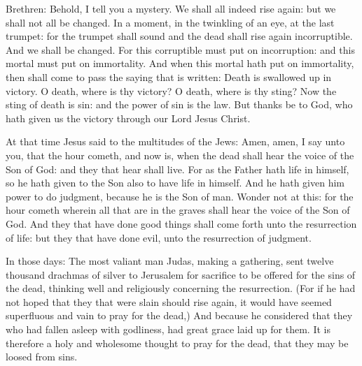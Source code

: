 




Brethren: Behold, I tell you a mystery. We shall all indeed rise again: but
we shall not all be changed.
In a moment, in the twinkling of an eye, at the last trumpet: for
the trumpet shall sound and the dead shall rise again incorruptible. And
we shall be changed.
For this corruptible must put on incorruption: and this mortal
must put on immortality.
And when this mortal hath put on immortality, then shall come to
pass the saying that is written: Death is swallowed up in victory.
O death, where is thy victory? O death, where is thy sting?
Now the sting of death is sin: and the power of sin is the law.
But thanks be to God, who hath given us the victory through our
Lord Jesus Christ.




At that time Jesus said to the multitudes of the Jews:
Amen, amen, I say unto you, that the hour cometh, and now is, when
the dead shall hear the voice of the Son of God: and they that hear
shall live.
For as the Father hath life in himself, so he hath given to the
Son also to have life in himself.
And he hath given him power to do judgment, because he is the Son
of man.
Wonder not at this: for the hour cometh wherein all that are in
the graves shall hear the voice of the Son of God.
And they that have done good things shall come forth unto the
resurrection of life: but they that have done evil, unto the
resurrection of judgment.




In those days: The most valiant man Judas, making a gathering, sent twelve thousand drachmas of silver
to Jerusalem for sacrifice to be offered for the sins of the dead,
thinking well and religiously concerning the resurrection.
(For if he had not hoped that they that were slain should rise
again, it would have seemed superfluous and vain to pray for the dead,)
And because he considered that they who had fallen asleep with
godliness, had great grace laid up for them.
It is therefore a holy and wholesome thought to pray for the
dead, that they may be loosed from sins.


